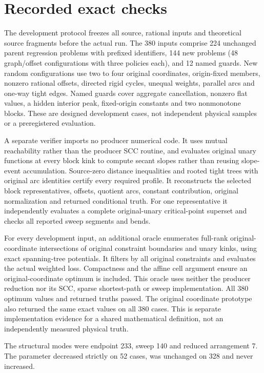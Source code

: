 
\section{Recorded exact checks}
\label{sec:checks}
The development protocol freezes all source, rational inputs and theoretical
source fragments before the actual run. The 380 inputs comprise 224 unchanged
parent regression problems with prefixed identifiers, 144 new problems
(48 graph/offset configurations with three policies each), and 12 named guards.
New random configurations use two to four original coordinates, origin-fixed
members, nonzero rational offsets, directed rigid cycles, unequal weights,
parallel arcs and one-way tight edges. Named guards cover aggregate cancellation,
nonzero flat values, a hidden interior peak, fixed-origin constants and two
nonmonotone blocks. These are designed development cases, not independent
physical samples or a preregistered evaluation.

A separate verifier imports no producer numerical code. It uses mutual
reachability rather than the producer SCC routine, and evaluates original
unary functions at every block kink to compute secant slopes rather than
reusing slope-event accumulation. Source-zero distance inequalities and rooted
tight trees with original arc identities certify every required profile.
It reconstructs the selected block representatives, offsets, quotient arcs,
constant contribution, original normalization and returned conditional truth.
For one representative it independently evaluates a complete original-unary
critical-point superset and checks all reported sweep segments and bends.

For every development input, an additional oracle enumerates full-rank
original-coordinate intersections of original constraint boundaries and unary
kinks, using exact spanning-tree potentials. It filters by all original
constraints and evaluates the actual weighted loss. Compactness and the affine
cell argument ensure an original-coordinate optimum is included. This oracle
uses neither the producer reduction nor its SCC, sparse shortest-path or sweep
implementation. All 380 optimum values and returned truths passed. The original
coordinate prototype also returned the same exact values on all 380 cases.
This is separate implementation evidence for a shared mathematical definition,
not an independently measured physical truth.

The structural modes were endpoint 233, sweep 140
and reduced arrangement 7.
The parameter decreased strictly on 52 cases,
was unchanged on 328 and never increased.

